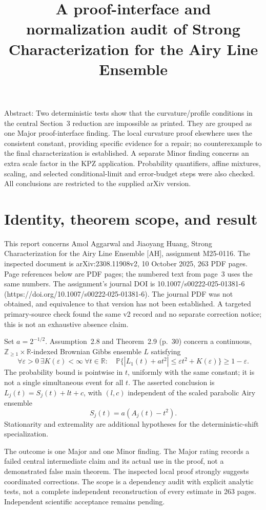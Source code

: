 \documentclass[10pt]{article}
\title{A proof-interface and normalization audit of
Strong Characterization for the Airy Line Ensemble}
\author{}
\date{}
\begin{document}
\maketitle
Abstract: Two deterministic tests show that the curvature/profile conditions in the central Section 3 reduction are impossible as printed. They are grouped as one Major proof-interface finding. The local curvature proof elsewhere uses the consistent constant, providing specific evidence for a repair; no counterexample to the final characterization is established. A separate Minor finding concerns an extra scale factor in the KPZ application. Probability quantifiers, affine mixtures, scaling, and selected conditional-limit and error-budget steps were also checked. All conclusions are restricted to the supplied arXiv version.\par
\section*{Identity, theorem scope, and result}
This report concerns Amol Aggarwal and Jiaoyang Huang, Strong Characterization for the Airy Line Ensemble [AH], assignment M25-0116. The inspected document is arXiv:2308.11908v2, 10 October 2025, 263 PDF pages. Page references below are PDF pages; the numbered text from page 3 uses the same numbers. The assignment’s journal DOI is 10.1007/s00222-025-01381-6 (https://doi.org/10.1007/s00222-025-01381-6). The journal PDF was not obtained, and equivalence to that version has not been established. A targeted primary-source check found the same v2 record and no separate correction notice; this is not an exhaustive absence claim.\par
Set \(a=2^{-1/2}\). Assumption 2.8 and Theorem 2.9 (p. 30) concern a continuous, \(\mathbb Z_{\ge1}\times\mathbb R\)-indexed Brownian Gibbs ensemble \(L\) satisfying \[\forall\varepsilon>0\ \exists K(\varepsilon)<\infty\
 \forall t\in\mathbb R:\quad
 \mathbb P\{|L_1(t)+at^2|\le\varepsilon t^2+K(\varepsilon)\}
 \ge1-\varepsilon.\] The probability bound is pointwise in \(t\), uniformly with the same constant; it is not a single simultaneous event for all \(t\). The asserted conclusion is \(L_j(t)=S_j(t)+lt+c\), with \((l,c)\) independent of the scaled parabolic Airy ensemble \[S_j(t)=a(A_j(t)-t^2).\] Stationarity and extremality are additional hypotheses for the deterministic-shift specialization.\par
The outcome is one Major and one Minor finding. The Major rating records a failed central intermediate claim and its actual use in the proof, not a demonstrated false main theorem. The inspected local proof strongly suggests coordinated corrections. The scope is a dependency audit with explicit analytic tests, not a complete independent reconstruction of every estimate in 263 pages. Independent scientific acceptance remains pending.\par
\end{document}
